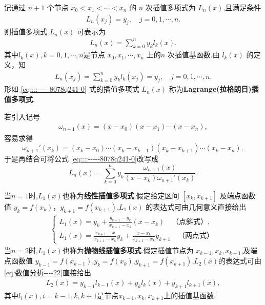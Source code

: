 \documentclass[../../main.tex]{subfiles}%
\begin{document}
\begin{theorem}\label{theorem:Lagrange插值多项式111}
记通过 $n + 1$ 个节点 $x_0 < x_1 < \cdots < x_n$ 的 $n$ 次插值多项式为 $L_n(x)$,且满足条件 
\begin{align}
L_n(x_j) = y_j, \quad j = 0, 1, \cdots, n.\label{equation::::----9812792387--89274}
\end{align}
则插值多项式 $L_n(x)$ 可表示为
\begin{align}
L_n(x) = \sum_{k = 0}^n y_k l_k(x).\label{eq::::-----8078q241-0}
\end{align}
其中$l_k(x),k=0,1,\cdots,n$是节点 $x_0, x_1, \cdots, x_n$ 上的$n$ 次插值基函数.由 $l_k(x)$ 的定义，知 
\begin{align}
L_n(x_j) = \sum_{k = 0}^n y_k l_k(x_j) = y_j, \quad j = 0, 1, \cdots, n.\label{eq:数值分析----22}
\end{align}
形如 \eqref{eq::::-----8078q241-0} 式的插值多项式 $L_n(x)$ 称为\textbf{Lagrange(拉格朗日)插值多项式}.

若引入记号 
\begin{align}
\omega_{n + 1}(x) = (x - x_0)(x - x_1) \cdots (x - x_n),\label{eq:数值分析-2.10}
\end{align}
容易求得 
\[
\omega_{n + 1}'(x_k) = (x_k - x_0) \cdots (x_k - x_{k - 1})(x_k - x_{k + 1}) \cdots (x_k - x_n),
\]
于是再结合可将公式 \eqref{eq::::-----8078q241-0}改写成 
\[
L_n(x) = \sum_{k = 0}^n y_k \frac{\omega_{n + 1}(x)}{(x - x_k) \omega_{n + 1}'(x_k)}.
\]
\end{theorem}
\begin{remark}
当$n=1$时,$L_1(x)$也称为\textbf{线性插值多项式}.假定给定区间 $[x_k, x_{k + 1}]$ 及端点函数值 $y_k = f(x_k)$，$y_{k + 1} = f(x_{k + 1})$,$L_1(x)$ 的表达式可由几何意义直接给出 
\begin{align}
\begin{cases} 
L_1(x) = y_k + \frac{y_{k + 1} - y_k}{x_{k + 1} - x_k}(x - x_k) \quad \text{（点斜式）}, \\ 
L_1(x) = \frac{x_{k + 1} - x}{x_{k + 1} - x_k} y_k + \frac{x - x_k}{x_{k + 1} - x_k} y_{k + 1} \quad \text{（两点式）} 
\end{cases}\label{eq::---8978980678--891213--2.1}
\end{align}
当$n=2$时,$L_1(x)$也称为\textbf{抛物线插值多项式}.假定插值节点为 $x_{k - 1}, x_k, x_{k + 1}$,及端点函数值 $y_{k-1} = f(x_{k-1})$,$y_k=f(x_k)$,$y_{k + 1} = f(x_{k + 1})$,$L_2(x)$的表达式可由\eqref{eq:数值分析----22}直接给出
\begin{align}\label{eq:数值分析-2.5}
L_2\left( x \right) =y_{k-1}l_{k-1}\left( x \right) +y_kl_k\left( x \right) +y_{k+1}l_{k+1}\left( x \right),
\end{align}
其中$l_i\left( x \right) ,i=k-1,k,k+1$是节点$x_{k-1},x_k,x_{k+1}$上的插值基函数.
\end{remark}
\end{document}
